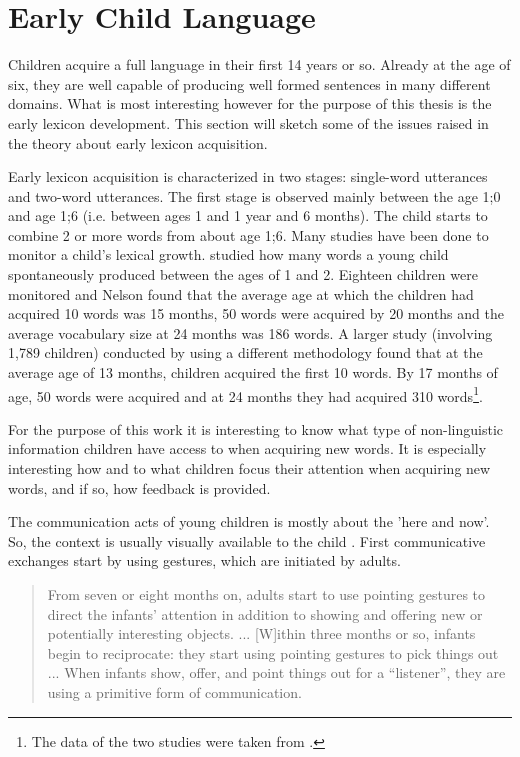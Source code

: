 

\section{Early Child Language}\label{s:theory:acquisition}

Children acquire a full language in their first 14 years or so. Already at the age of six, they are well capable of producing well formed sentences in many different domains. What is most interesting however for the purpose of this thesis is the early lexicon development. This section will sketch some of the issues raised in the theory about early lexicon acquisition.

\p
Early lexicon acquisition is characterized in two stages: single-word utterances and two-word utterances. The first stage is observed mainly between the age 1;0 and age 1;6 (i.e. between ages 1 and 1 year and 6 months). The child starts to combine 2 or more words from about age 1;6. Many studies have been done to monitor a child's lexical growth.  studied how many words a young child spontaneously produced between the ages of 1 and 2. Eighteen children were monitored and Nelson found that the average age at which the children had acquired 10 words was 15 months, 50 words were acquired by 20 months and the average vocabulary size at 24 months was 186 words. A larger study (involving 1,789 children) conducted by  using a different methodology found that at the average age of 13 months, children acquired the first 10 words. By 17 months of age, 50 words were acquired and at 24 months they had acquired 310 words\footnote{The data of the two studies were taken from \cite{barrett:1995}.}.

\n
For the purpose of this work it is interesting to know what type of non-linguistic information children have access to when acquiring new words. It is especially interesting how and to what children focus their attention when acquiring new words, and if so, how feedback is provided. 

The communication acts of young children is mostly about the 'here and now'. So, the context is usually visually available to the child \cite{clarkclark:1977}. First communicative exchanges start by using gestures, which are initiated by adults.

\begin{quote}
From seven or eight months on, adults start to use pointing gestures to direct the infants' attention in addition to showing and offering new or potentially interesting objects. ... [W]ithin three months or so, infants begin to reciprocate: they start using pointing gestures to pick things out ... When infants show, offer, and point things out for a ``listener'', they are using a primitive form of communication. \cite[pp. 312-313]{clarkclark:1977}
\end{quote}

